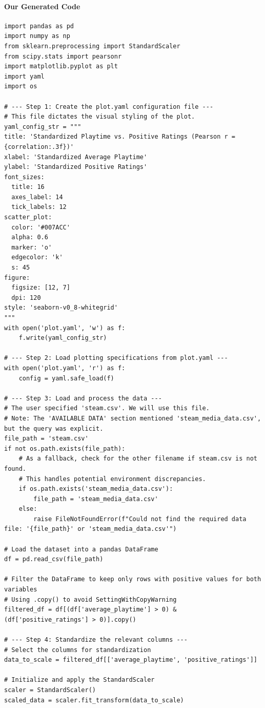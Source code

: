 \paragraph{Our Generated Code}
\begin{verbatim}
import pandas as pd
import numpy as np
from sklearn.preprocessing import StandardScaler
from scipy.stats import pearsonr
import matplotlib.pyplot as plt
import yaml
import os

# --- Step 1: Create the plot.yaml configuration file ---
# This file dictates the visual styling of the plot.
yaml_config_str = """
title: 'Standardized Playtime vs. Positive Ratings (Pearson r = {correlation:.3f})'
xlabel: 'Standardized Average Playtime'
ylabel: 'Standardized Positive Ratings'
font_sizes:
  title: 16
  axes_label: 14
  tick_labels: 12
scatter_plot:
  color: '#007ACC'
  alpha: 0.6
  marker: 'o'
  edgecolor: 'k'
  s: 45
figure:
  figsize: [12, 7]
  dpi: 120
style: 'seaborn-v0_8-whitegrid'
"""
with open('plot.yaml', 'w') as f:
    f.write(yaml_config_str)

# --- Step 2: Load plotting specifications from plot.yaml ---
with open('plot.yaml', 'r') as f:
    config = yaml.safe_load(f)

# --- Step 3: Load and process the data ---
# The user specified 'steam.csv'. We will use this file.
# Note: The 'AVAILABLE DATA' section mentioned 'steam_media_data.csv', but the query was explicit.
file_path = 'steam.csv'
if not os.path.exists(file_path):
    # As a fallback, check for the other filename if steam.csv is not found.
    # This handles potential environment discrepancies.
    if os.path.exists('steam_media_data.csv'):
        file_path = 'steam_media_data.csv'
    else:
        raise FileNotFoundError(f"Could not find the required data file: '{file_path}' or 'steam_media_data.csv'")

# Load the dataset into a pandas DataFrame
df = pd.read_csv(file_path)

# Filter the DataFrame to keep only rows with positive values for both variables
# Using .copy() to avoid SettingWithCopyWarning
filtered_df = df[(df['average_playtime'] > 0) & (df['positive_ratings'] > 0)].copy()

# --- Step 4: Standardize the relevant columns ---
# Select the columns for standardization
data_to_scale = filtered_df[['average_playtime', 'positive_ratings']]

# Initialize and apply the StandardScaler
scaler = StandardScaler()
scaled_data = scaler.fit_transform(data_to_scale)


\end{verbatim}
